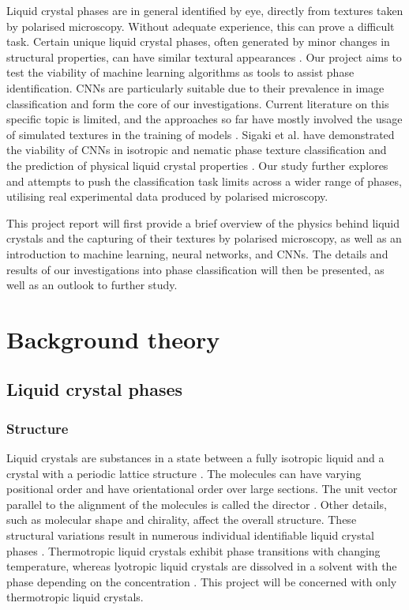 \documentclass[12pt]{article}
\begin{document}
Liquid crystal phases are in general identified by eye, directly from textures taken by polarised microscopy. Without adequate experience, this can prove a difficult task. Certain unique liquid crystal phases, often generated by minor changes in structural properties, can have similar textural appearances \cite{Dierking03}. Our project aims to test the viability of machine learning algorithms as tools to assist phase identification. CNNs are particularly suitable due to their prevalence in image classification and form the core of our investigations. Current literature on this specific topic is limited, and the approaches so far have mostly involved the usage of simulated textures in the training of models \cite{Sigaki20, Minor20}. Sigaki et al. have demonstrated the viability of CNNs in isotropic and nematic phase texture classification and the prediction of physical liquid crystal properties \cite{Sigaki20}. Our study further explores and attempts to push the classification task limits across a wider range of phases, utilising real experimental data produced by polarised microscopy.

This project report will first provide a brief overview of the physics behind liquid crystals and the capturing of their textures by polarised microscopy, as well as an introduction to machine learning, neural networks, and CNNs. The details and results of our investigations into phase classification will then be presented, as well as an outlook to further study.
\section{Background theory}
\subsection{Liquid crystal phases}
\subsubsection{Structure}
Liquid crystals are substances in a state between a fully isotropic liquid and a crystal with a periodic lattice structure \cite{Demus99, Dierking03}. The molecules can have varying positional order and have orientational order over large sections. The unit vector parallel to the alignment of the molecules is called the director \cite{Demus99, Dierking03}. Other details, such as molecular shape and chirality, affect the overall structure. These structural variations result in numerous individual identifiable liquid crystal phases \cite{Demus99, Dierking03}. Thermotropic liquid crystals exhibit phase transitions with changing temperature, whereas lyotropic liquid crystals are dissolved in a solvent with the phase depending on the concentration \cite{Demus99}. This project will be concerned with only thermotropic liquid crystals. 
\end{document}
